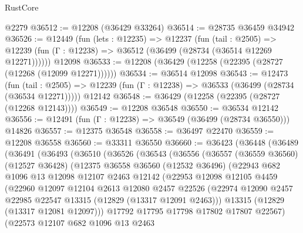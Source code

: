 \begin{lexlean}{RustCore}
\begin{coremodule}
    @2279
@36512 := @12208 (@36429 @33264)
@36514 := @28735 @36459 @34942
@36526 := @12449
    (fun (lets : @12235) =>
    @12237
      (fun (tail : @2505) =>
      @12239 (fun (Γ : @12238) => @36512 (@36499 (@28734 (@36514 @12269 @12271))))))
    @12098
@36533 := @12208 (@36429 (@12258 (@22395 (@28727 (@12268 (@12099 @12271))))))
@36534 := @36514 @12098
@36543 := @12473
    (fun (tail : @2505) => @12239 (fun (Γ : @12238) => @36533 (@36499 (@28734 (@36534 @12271)))))
    @12142
@36548 := @36429 (@12258 (@22395 (@28727 (@12268 @12143))))
@36549 := @12208 @36548
@36550 := @36534 @12142
@36556 := @12491 (fun (Γ : @12238) => @36549 (@36499 (@28734 @36550))) @14826
@36557 := @12375 @36548
@36558 := @36497 @22470
@36559 := @12208 @36558
@36560 := @33311 @36550
@36660 := @36423
    (@36448
      (@36489
        (@36491
          (@36493
            (@36510
              (@36526
                (@36543
                  (@36556
                    (@36557
                      (@36559 @36560)
                      (@12527 @36428)
                      (@12375
                        @36558
                        @36560
                        (@12532 @36496)
                        (@22943
                          @682
                          @1096
                          @13
                          @12098
                          @12107
                          @2463
                          @12142
                          (@22953
                            @12098
                            @12105
                            @4459
                            (@22960
                              @12097
                              @12104
                              @2613
                              @12080
                              @2457
                              @22526
                              (@22974
                                @12090
                                @2457
                                @22985
                                @22547
                                @13315
                                (@12829 (@13317 @12091 @2463)))
                              @13315
                              (@12829 (@13317 @12081 @12097)))
                            @17792
                            @17795
                            @17798
                            @17802
                            @17807
                            @22567)
                          (@22573
                            @12107
                            @682
                            @1096
                            @13
                            @2463

\end{coremodule}
\end{lexlean}
